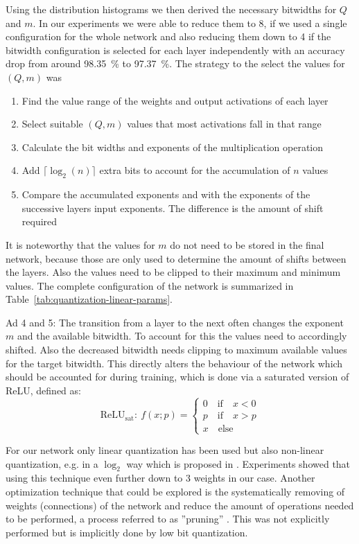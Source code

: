 Using the distribution histograms we then derived the necessary bitwidths for $Q$ and $m$. In our experiments we were able to reduce them to \SI{8}{\bit}, if we used a single configuration for the whole network and also reducing them down to \SI{4}{\bit} if the bitwidth configuration is selected for each layer independently with an accuracy drop from around \SI{98.35}{\percent} to \SI{97.37}{\percent}. The strategy to the select the values for $(Q,m)$ was
\begin{enumerate}
	\item Find the value range of the weights and output activations of each layer
	\item Select suitable $(Q,m)$ values that most activations fall in that range
	\item Calculate the bit widths and exponents of the multiplication operation
	\item Add $\lceil \log_2(n) \rceil$ extra bits to account for the accumulation of $n$ values
	\item Compare the accumulated exponents and with the exponents of the successive layers input exponents. The difference is the amount of shift required
\end{enumerate}
It is noteworthy that the values for $m$ do not need to be stored in the final network, because those are only used to determine the amount of shifts between the layers. Also the values need to be clipped to their maximum and minimum values. The complete configuration of the network is summarized in Table~\ref{tab:quantization-linear-params}.

Ad 4 and 5: The transition from a layer to the next often changes the exponent $m$ and the available bitwidth. To account for this the values need to accordingly shifted. Also the decreased bitwidth needs clipping to maximum available values for the target bitwidth. This directly alters the behaviour of the network which should be accounted for during training, which is done via a saturated version of ReLU, defined as:
\begin{equation}
    \text{ReLU}_{\text{sat}}: ~ f(x;p) = \begin{cases}
		0 	\quad \text{if} \quad x < 0 \\
		p 	\quad \text{if} \quad x > p \\
		x	\quad \text{else}
	\end{cases}
\end{equation}

For our network only linear quantization has been used but also non-linear quantization, e.g. in a $\log_2$ way which is proposed in \cite{Lee:2017aa}. Experiments showed that using this technique even further down to \SI{3}{\bit} weights in our case.
Another optimization technique that could be explored is the systematically removing of weights (connections) of the network and reduce the amount of operations needed to be performed, a process referred to as ''pruning'' \cite{Zhu:2017aa}. This was not explicitly performed but is implicitly done by low bit quantization.

